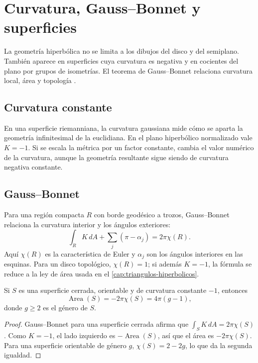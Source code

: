 \chapter{Curvatura, Gauss--Bonnet y superficies}
\label{cap:curvatura-superficies}

La geometría hiperbólica no se limita a los dibujos del disco y del semiplano. También aparece en superficies cuya curvatura es negativa y en cocientes del plano por grupos de isometrías. El teorema de Gauss--Bonnet relaciona curvatura local, área y topología \cite{ratcliffe2006,stillwell1992}.

\section{Curvatura constante}

En una superficie riemanniana, la curvatura gaussiana mide cómo se aparta la geometría infinitesimal de la euclidiana. En el plano hiperbólico normalizado vale \(K=-1\). Si se escala la métrica por un factor constante, cambia el valor numérico de la curvatura, aunque la geometría resultante sigue siendo de curvatura negativa constante.

\section{Gauss--Bonnet}

Para una región compacta \(R\) con borde geodésico a trozos, Gauss--Bonnet relaciona la curvatura interior y los ángulos exteriores:
\begin{equation}
  \int_R K\,dA+\sum_j(\pi-\alpha_j)=2\pi\chi(R).
  \label{eq:gauss-bonnet-borde}
\end{equation}
Aquí \(\chi(R)\) es la característica de Euler y \(\alpha_j\) son los ángulos interiores en las esquinas. Para un disco topológico, \(\chi(R)=1\); si además \(K=-1\), la fórmula se reduce a la ley de área usada en el \cref{cap:triangulos-hiperbolicos}.

\begin{theorem}
Si \(S\) es una superficie cerrada, orientable y de curvatura constante \(-1\), entonces
\begin{equation}
  \operatorname{Area}(S)=-2\pi\chi(S)=4\pi(g-1),
  \label{eq:area-superficie-cerrada}
\end{equation}
donde \(g\geq 2\) es el género de \(S\).
\end{theorem}

\begin{proof}
Gauss--Bonnet para una superficie cerrada afirma que \(\int_S K\,dA=2\pi\chi(S)\). Como \(K=-1\), el lado izquierdo es \(-\operatorname{Area}(S)\), así que el área es \(-2\pi\chi(S)\). Para una superficie orientable de género \(g\), \(\chi(S)=2-2g\), lo que da la segunda igualdad.
\end{proof}

